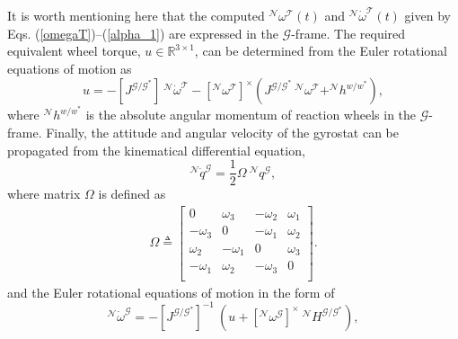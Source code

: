 \documentclass[journal ]{new-aiaa}
\begin{document}
It is worth mentioning here that the computed $^\mathcal{N}\omega^\mathcal{T}(t)$ and $^\mathcal{N}\dot{\omega}^\mathcal{T}(t)$  given by Eqs. (\ref{omegaT})--(\ref{alpha_1}) are expressed in the $\mathcal{G}$-frame. The required equivalent wheel torque, $u\in\mathbb{R}^{3\times 1}$, can be determined from the Euler rotational equations of motion as 
\begin{equation} \label{Euler_RBD}
u=-[J^{\mathcal{G/G^*}}]\ ^\mathcal{N}\dot{\omega}^\mathcal{T} - [^\mathcal{N}\omega^\mathcal{T}]^{ \times} (J^{\mathcal{G/G^*}}\ ^\mathcal{N}\omega^\mathcal{T}+^\mathcal{N}h^{w/w^*}),
\end{equation} 
 where $^\mathcal{N}h^{w/w^*}$ is the absolute angular momentum of reaction wheels in the $\mathcal{G}$-frame. Finally, the attitude and angular velocity of the gyrostat can be propagated from the kinematical differential equation, 
\begin{equation} \label{kinematics}
^\mathcal{N}\dot{q}^\mathcal{G} = \frac{1}{2} \Omega\ ^\mathcal{N}q^\mathcal{G}, 
\end{equation}
where matrix $\Omega$ is defined as
\begin{gather} \label{k_omega}
\Omega \triangleq
\begin{bmatrix}
0 & \omega_3 & -\omega_2 & \omega_1 \\
-\omega_3 & 0 & -\omega_1 & \omega_2 \\
\omega_2 & -\omega_1 & 0 & \omega_3 \\ 
-\omega_1 & \omega_2 & -\omega_3 & 0 \\ 
\end{bmatrix}.
\end{gather}
and the Euler rotational equations of motion in the form of 
\begin{equation} \label{Euler_RBD1}
^\mathcal{N}\dot{\omega}^\mathcal{G} =-[J^{\mathcal{G/G^*}}]^{-1}\ (u+ [^\mathcal{N}\omega^\mathcal{G}]^{ \times} \ ^\mathcal{N}H^{\mathcal{G/G^*}}),
\end{equation} 
%
%
%
%
%
\end{document}
